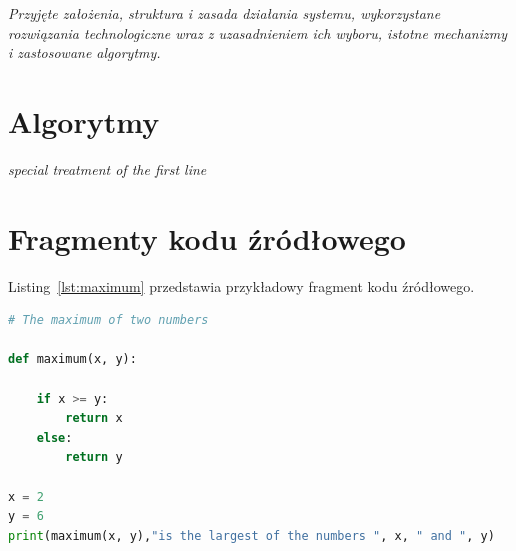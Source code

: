 \documentclass[polish]{aghengthesis}
\begin{document}
\emph{Przyjęte założenia, struktura i zasada działania systemu, wykorzystane rozwiązania technologiczne wraz z uzasadnieniem ich wyboru, istotne mechanizmy i zastosowane algorytmy.}

\section{Algorytmy}
\label{sec:algorytmy}

\begin{algorithm}[!htbp]
\BlankLine
\emph{special treatment of the first line}\;
  \caption[Przykładowy algorytm]{Przykładowy algorytm.}
  \label{alg:pseudo-code}
\end{algorithm}

\section{Fragmenty kodu źródłowego}
\label{sec:listingi}
Listing~\ref{lst:maximum} przedstawia przykładowy fragment kodu źródłowego.

\begin{lstlisting}[language=Python,float=!htbp,
    caption={[Przykładowy fragment kodu]Przykładowy fragment kodu },label=lst:maximum]
# The maximum of two numbers

def maximum(x, y):

    if x >= y:
        return x
    else:
        return y

x = 2
y = 6
print(maximum(x, y),"is the largest of the numbers ", x, " and ", y)

\end{lstlisting}
\end{document}
